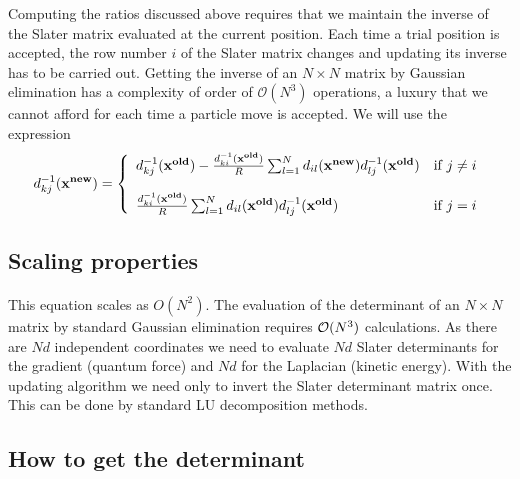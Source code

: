 \documentclass[%
twoside,                 %
final,                   %
10pt]{article}
\begin{document}
Computing the ratios discussed above requires that we maintain 
the inverse of the Slater matrix evaluated at the current position. 
Each time a trial position is accepted, the row number $i$ of the Slater 
matrix changes and updating its inverse has to be carried out. 
Getting the inverse of an $N \times N$ matrix by Gaussian elimination has a 
complexity of order of $\mathcal{O}(N^3)$ operations, a luxury that we 
cannot afford for each time a particle  move is accepted.
We will use the expression
\begin{equation}
\label{updatingInverse}
d^{-1}_{kj}(\mathbf{x^{new}}) = \left\{\begin{array}{l l}
  d^{-1}_{kj}(\mathbf{x^{old}}) - \frac{d^{-1}_{ki}(\mathbf{x^{old}})}{R} \sum_{l=1}^{N} d_{il}(\mathbf{x^{new}})  d^{-1}_{lj}(\mathbf{x^{old}}) & \mbox{if $j \neq i$}\nonumber \\ \\
 \frac{d^{-1}_{ki}(\mathbf{x^{old}})}{R} \sum_{l=1}^{N} d_{il}(\mathbf{x^{old}}) d^{-1}_{lj}(\mathbf{x^{old}}) & \mbox{if $j=i$}
\end{array} \right.
\end{equation}



\subsection*{Scaling properties}

\paragraph{}
This equation scales as $O(N^2)$.
The evaluation of the determinant of an $N \times N$ matrix by standard Gaussian elimination 
requires ${\cal O}(N^3)$
calculations. 
As there are $Nd$ independent coordinates we need to evaluate $Nd$ Slater determinants 
for the gradient (quantum force) and $Nd$ for the Laplacian (kinetic energy). 
With the updating algorithm we need only to invert the Slater 
determinant matrix once. This can be done by standard LU decomposition methods.



\subsection*{How to get the determinant}

\end{document}
